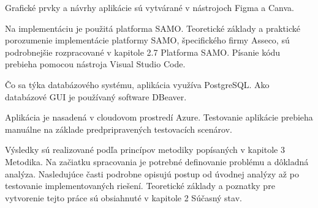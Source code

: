 Grafické prvky a návrhy aplikácie sú vytvárané v nástrojoch Figma a Canva.

Na implementáciu je použitá platforma SAMO. Teoretické základy a praktické porozumenie implementácie platformy SAMO, špecifického  firmy Asseco, sú podrobnejšie rozpracované v kapitole 2.7 Platforma SAMO. Písanie kódu prebieha pomocou nástroja Visual Studio Code.

Čo sa týka databázového systému, aplikácia využíva PostgreSQL. Ako databázové GUI je používaný software DBeaver.

Aplikácia je nasadená v cloudovom prostredí Azure. Testovanie aplikácie prebieha manuálne na základe predpripravených testovacích scenárov.


%




%
%
%
%
%
%

Výsledky sú realizované podľa princípov metodiky popísaných v kapitole 3 Metodika. Na začiatku spracovania je potrebné definovanie problému a dôkladná analýza. Nasledujúce časti podrobne opisujú postup od úvodnej analýzy až po testovanie implementovaných riešení. Teoretické základy a poznatky pre vytvorenie tejto práce sú obsiahnuté v kapitole 2 Súčasný stav.

